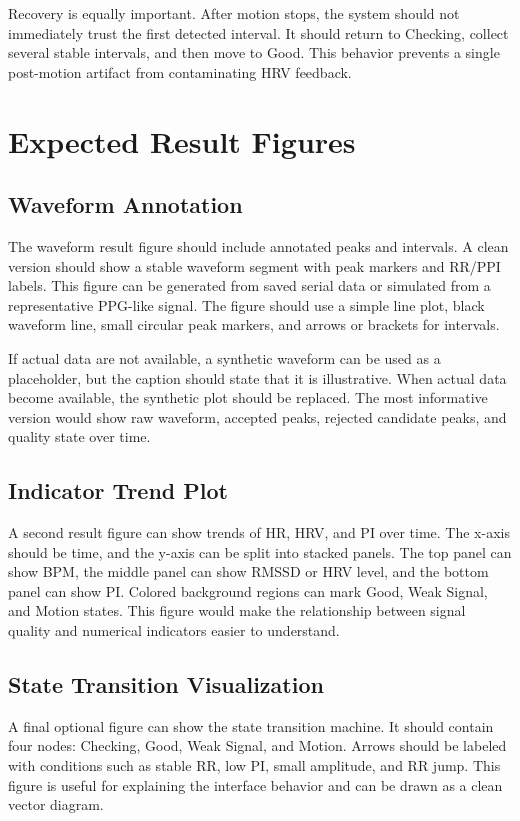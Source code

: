 \documentclass[10pt,conference]{IEEEtran}
\begin{document}
Recovery is equally important. After motion stops, the system should not immediately trust the first detected interval. It should return to Checking, collect several stable intervals, and then move to Good. This behavior prevents a single post-motion artifact from contaminating HRV feedback.

\section{Expected Result Figures}
\subsection{Waveform Annotation}
The waveform result figure should include annotated peaks and intervals. A clean version should show a stable waveform segment with peak markers and RR/PPI labels. This figure can be generated from saved serial data or simulated from a representative PPG-like signal. The figure should use a simple line plot, black waveform line, small circular peak markers, and arrows or brackets for intervals.

If actual data are not available, a synthetic waveform can be used as a placeholder, but the caption should state that it is illustrative. When actual data become available, the synthetic plot should be replaced. The most informative version would show raw waveform, accepted peaks, rejected candidate peaks, and quality state over time.

\subsection{Indicator Trend Plot}
A second result figure can show trends of HR, HRV, and PI over time. The x-axis should be time, and the y-axis can be split into stacked panels. The top panel can show BPM, the middle panel can show RMSSD or HRV level, and the bottom panel can show PI. Colored background regions can mark Good, Weak Signal, and Motion states. This figure would make the relationship between signal quality and numerical indicators easier to understand.

\subsection{State Transition Visualization}
A final optional figure can show the state transition machine. It should contain four nodes: Checking, Good, Weak Signal, and Motion. Arrows should be labeled with conditions such as stable RR, low PI, small amplitude, and RR jump. This figure is useful for explaining the interface behavior and can be drawn as a clean vector diagram.
\end{document}
